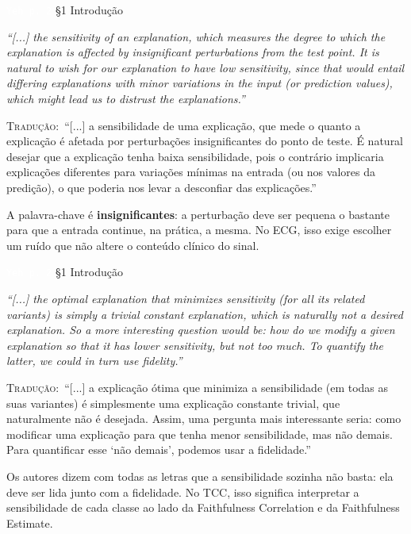 \documentclass[11pt,a4paper]{article}
\newcommand{\pagechip}[1]{{\setlength{\fboxsep}{1.5pt}\colorbox{cAcc}{\textcolor{white}{\scriptsize\texttt{#1}}}}}
\newenvironment{origquote}{\par\itshape\small}{\par}
\newenvironment{tradquote}{\par\small\textsc{Tradução:}\ }{\par}
\newcommand{\explab}[1]{\par\smallskip{\small\color{cAcc}\textbf{\MakeUppercase{#1}}}\par}
\begin{document}
\begin{citacard}{\pagechip{Yeh p. 2} §1 Introdução}
\begin{origquote}“[...] the sensitivity of an explanation, which measures the degree to which the explanation is affected by insignificant perturbations from the test point. It is natural to wish for our explanation to have low sensitivity, since that would entail differing explanations with minor variations in the input (or prediction values), which might lead us to distrust the explanations.”\end{origquote}
\begin{tradquote}“[...] a sensibilidade de uma explicação, que mede o quanto a explicação é afetada por perturbações insignificantes do ponto de teste. É natural desejar que a explicação tenha baixa sensibilidade, pois o contrário implicaria explicações diferentes para variações mínimas na entrada (ou nos valores da predição), o que poderia nos levar a desconfiar das explicações.”\end{tradquote}
\explab{Explicação}
A palavra-chave é \textbf{insignificantes}: a perturbação deve ser pequena o bastante para que a entrada continue, na prática, a mesma. No ECG, isso exige escolher um ruído que não altere o conteúdo clínico do sinal.
\end{citacard}

\begin{citacard}{\pagechip{Yeh p. 2} §1 Introdução}
\begin{origquote}“[...] the optimal explanation that minimizes sensitivity (for all its related variants) is simply a trivial constant explanation, which is naturally not a desired explanation. So a more interesting question would be: how do we modify a given explanation so that it has lower sensitivity, but not too much. To quantify the latter, we could in turn use fidelity.”\end{origquote}
\begin{tradquote}“[...] a explicação ótima que minimiza a sensibilidade (em todas as suas variantes) é simplesmente uma explicação constante trivial, que naturalmente não é desejada. Assim, uma pergunta mais interessante seria: como modificar uma explicação para que tenha menor sensibilidade, mas não demais. Para quantificar esse ‘não demais’, podemos usar a fidelidade.”\end{tradquote}
\explab{Explicação}
Os autores dizem com todas as letras que a sensibilidade sozinha não basta: ela deve ser lida junto com a fidelidade. No TCC, isso significa interpretar a sensibilidade de cada classe ao lado da Faithfulness Correlation e da Faithfulness Estimate.
\end{citacard}
\end{document}
